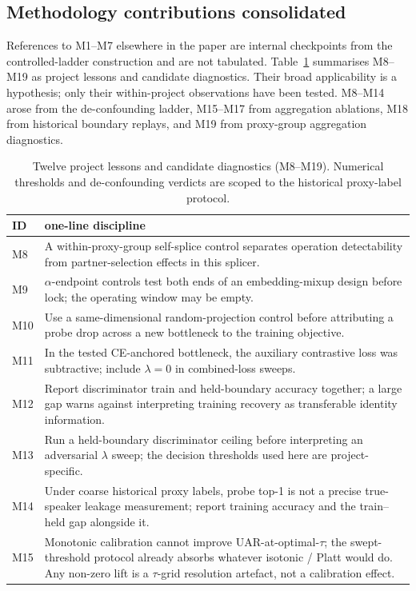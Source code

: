 \subsection{Methodology contributions consolidated}
\label{ssec:m_disciplines}

References to M1--M7 elsewhere in the paper are internal checkpoints from the controlled-ladder construction and are not tabulated. Table~\ref{tab:m_disciplines} summarises M8--M19 as project lessons and candidate diagnostics. Their broad applicability is a hypothesis; only their within-project observations have been tested. M8--M14 arose from the de-confounding ladder, M15--M17 from aggregation ablations, M18 from historical boundary replays, and M19 from proxy-group aggregation diagnostics.

\begin{table}[t]
\centering\footnotesize
\caption{Twelve project lessons and candidate diagnostics (M8--M19). Numerical thresholds and de-confounding verdicts are scoped to the historical proxy-label protocol.}
\label{tab:m_disciplines}
\begin{tabular}{lp{}}
\toprule
ID & one-line discipline \\
\midrule
M8  & A within-proxy-group self-splice control separates operation detectability from partner-selection effects in this splicer. \\
M9  & $\alpha$-endpoint controls test both ends of an embedding-mixup design before lock; the operating window may be empty. \\
M10 & Use a same-dimensional random-projection control before attributing a probe drop across a new bottleneck to the training objective. \\
M11 & In the tested CE-anchored bottleneck, the auxiliary contrastive loss was subtractive; include $\lambda=0$ in combined-loss sweeps. \\
M12 & Report discriminator train and held-boundary accuracy together; a large gap warns against interpreting training recovery as transferable identity information. \\
M13 & Run a held-boundary discriminator ceiling before interpreting an adversarial $\lambda$ sweep; the decision thresholds used here are project-specific. \\
M14 & Under coarse historical proxy labels, probe top-1 is not a precise true-speaker leakage measurement; report training accuracy and the train--held gap alongside it. \\
\midrule
M15 & Monotonic calibration cannot improve UAR-at-optimal-$\tau$; the swept-threshold protocol already absorbs whatever isotonic / Platt would do. Any non-zero lift is a $\tau$-grid resolution artefact, not a calibration effect. \\

\end{tabular}
\end{table}
